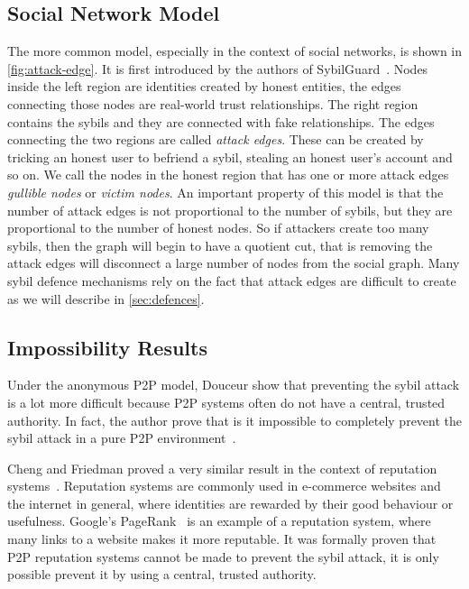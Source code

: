 \subsection{Social Network Model}
The more common model, especially in the context of social networks, is shown in
\autoref{fig:attack-edge}. It is first introduced by the authors of
SybilGuard~\cite{yu2006sybilguard}. Nodes inside the left region are identities
created by honest entities, the edges connecting those nodes are real-world
trust relationships. The right region contains the sybils and they are connected
with fake relationships. The edges connecting the two regions are called
\emph{attack edges}. These can be created by tricking an honest user to befriend
a sybil, stealing an honest user's account and so on. We call the nodes in the
honest region that has one or more attack edges \emph{gullible nodes} or
\emph{victim nodes}. An important property of this model is that the number of
attack edges is not proportional to the number of sybils, but they are
proportional to the number of honest nodes. So if attackers create too many
sybils, then the graph will begin to have a quotient cut, that is removing the
attack edges will disconnect a large number of nodes from the social graph. Many
sybil defence mechanisms rely on the fact that attack edges are difficult to
create as we will describe in \autoref{sec:defences}.

\subsection{Impossibility Results}\label{sec:sybil-theory}
Under the anonymous P2P model, Douceur show that preventing the sybil attack is
a lot more difficult because P2P systems often do not have a central, trusted
authority. In fact, the author prove that is it impossible to completely prevent
the sybil attack in a pure P2P environment~\cite{douceur2002sybil}.

Cheng and Friedman proved a very similar result in the context of reputation
systems~\cite{cheng2005sybilproof}. Reputation systems are commonly used in
e-commerce websites and the internet in general, where identities are rewarded
by their good behaviour or usefulness. Google's PageRank~\cite{page1999pagerank}
is an example of a reputation system, where many links to a website makes it
more reputable. It was formally proven that P2P reputation systems cannot be
made to prevent the sybil attack, it is only possible prevent it by using a
central, trusted authority.

